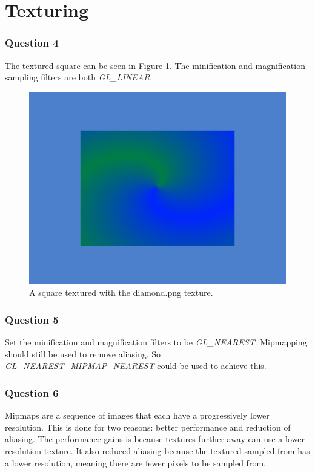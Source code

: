 \documentclass[a4paper]{article}
\date{}
\begin{document}
\thispagestyle{fancy}

\section{Texturing}
\subsubsection*{Question 4}

    The textured square can be seen in Figure \ref{fig:textured_diamond}. The
    minification and magnification sampling filters are both \emph{GL\_LINEAR}.
    
    \begin{figure}[H]
        \includegraphics[width=\linewidth]{textured_diamond}
        \caption{A square textured with the diamond.png texture.}
        \label{fig:textured_diamond}
    \end{figure}

\subsubsection*{Question 5}
    Set the minification and magnification filters to be \emph{GL\_NEAREST}.
    Mipmapping should still be used to remove aliasing. So
    \emph{GL\_NEAREST\_MIPMAP\_NEAREST} could be used to achieve this. 

\subsubsection*{Question 6}
    Mipmaps are a sequence of images that each have a progressively lower
    resolution. This is done for two reasons: better performance and reduction
    of aliasing. The performance gains is because textures further away can use
    a lower resolution texture. It also reduced aliasing because the textured
    sampled from has a lower resolution, meaning there are fewer pixels to be
    sampled from.
\end{document}
